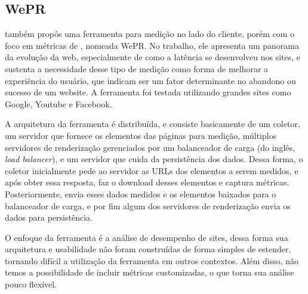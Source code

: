 \documentclass[12pt]{tcc}
\begin{document}
		\subsection{WePR}
		\label{WePR}
		\par \citet{Asrese2019MeasuringWL} também propôs uma ferramenta para medição no lado do cliente, porém com o foco em métricas de , nomeada WePR. No trabalho, ele apresenta um panorama da evolução da web, especialmente de como a latência se desenvolveu nos sites, e sustenta a necessidade desse tipo de medição como forma de melhorar a experiência do usuário, que indicam ser um fator determinante no abandono ou sucesso de um website. A ferramenta foi testada utilizando grandes sites como Google, Youtube e Facebook. 
		\par A arquitetura da ferramenta é distribuída, e consiste basicamente de um coletor, um servidor que fornece os elementos das páginas para medição, múltiplos servidores de renderização gerenciados por um balanceador de carga (do inglês, \emph{load balancer}), e um servidor que cuida da persistência dos dados. Dessa forma, o coletor inicialmente pede ao servidor as URLs dos elementos a serem medidos, e após obter essa resposta, faz o download desses elementos e captura métricas. Posteriormente, envia esses dados medidos e os elementos baixados para o balanceador de carga, e por fim algum dos servidores de renderização envia os dados para persistência.
		\par O enfoque da ferramenta é a análise de desempenho de sites, dessa forma sua arquitetura e usabilidade não foram construídas de forma simples de estender, tornando difícil a utilização da ferramenta em outros contextos. Além disso, não temos a possibilidade de incluir métricas customizadas, o que torna sua análise pouco flexível.
		
\end{document}
